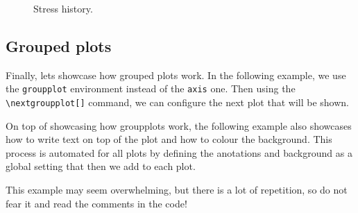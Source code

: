 \begin{TeXlstlisting}
\begin{figure}[h]
	\centering
	\caption{Stress history.}
	\label{fig:stress-evolution}
\end{figure}
\end{TeXlstlisting}

\subsection{Grouped plots}

Finally, lets showcase how grouped plots work. In the following example, we use the \verb|groupplot| environment instead of the \verb|axis| one. Then using the \verb|\nextgroupplot[]| command, we can configure the next plot that will be shown.

On top of showcasing how groupplots work, the following example also showcases how to write text on top of the plot and how to colour the background. This process is automated for all plots by defining the anotations and background as a global setting that then we add to each plot.

This example may seem overwhelming, but there is a lot of repetition, so do not fear it and read the comments in the code!


